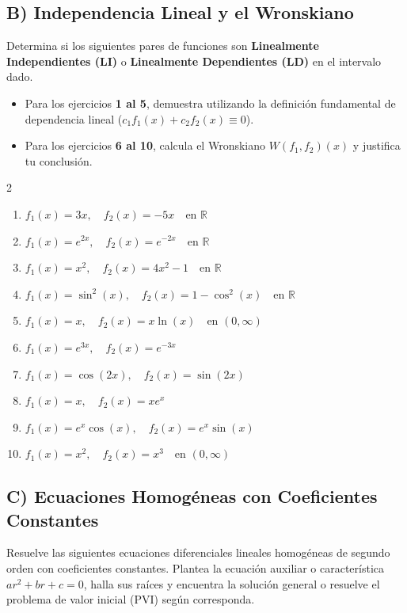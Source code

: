 \documentclass[a4paper,11pt]{article}
\begin{document}
\subsection*{B) Independencia Lineal y el Wronskiano}
Determina si los siguientes pares de funciones son \textbf{Linealmente Independientes (LI)} o \textbf{Linealmente Dependientes (LD)} en el intervalo dado.
\begin{itemize}[itemsep=0.05cm]
    \item Para los ejercicios \textbf{1 al 5}, demuestra utilizando la definición fundamental de dependencia lineal ($c_1 f_1(x) + c_2 f_2(x) \equiv 0$).
    \item Para los ejercicios \textbf{6 al 10}, calcula el Wronskiano $W(f_1, f_2)(x)$ y justifica tu conclusión.
\end{itemize}

\begin{multicols}{2}
\begin{enumerate}[itemsep=0.1cm]
    \item $f_1(x) = 3x, \quad f_2(x) = -5x \quad \text{en } \mathbb{R}$
    \item $f_1(x) = e^{2x}, \quad f_2(x) = e^{-2x} \quad \text{en } \mathbb{R}$
    \item $f_1(x) = x^2, \quad f_2(x) = 4x^2 - 1 \quad \text{en } \mathbb{R}$
    \item $f_1(x) = \sin^2(x), \quad f_2(x) = 1 - \cos^2(x) \quad \text{en } \mathbb{R}$
    \item $f_1(x) = x, \quad f_2(x) = x \ln(x) \quad \text{en } (0, \infty)$
    \item $f_1(x) = e^{3x}, \quad f_2(x) = e^{-3x}$
    \item $f_1(x) = \cos(2x), \quad f_2(x) = \sin(2x)$
    \item $f_1(x) = x, \quad f_2(x) = x e^x$
    \item $f_1(x) = e^x \cos(x), \quad f_2(x) = e^x \sin(x)$
    \item $f_1(x) = x^2, \quad f_2(x) = x^3 \quad \text{en } (0, \infty)$
\end{enumerate}
\end{multicols}

\newpage

\subsection*{C) Ecuaciones Homogéneas con Coeficientes Constantes}
Resuelve las siguientes ecuaciones diferenciales lineales homogéneas de segundo orden con coeficientes constantes. Plantea la ecuación auxiliar o característica $a r^2 + b r + c = 0$, halla sus raíces y encuentra la solución general o resuelve el problema de valor inicial (PVI) según corresponda.
\end{document}
